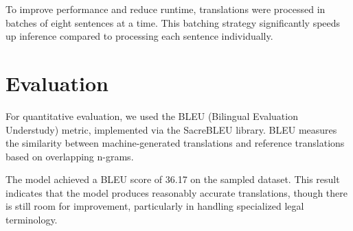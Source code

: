\documentclass[fleqn,moreauthors,10pt]{ds_report}
\begin{document}
To improve performance and reduce runtime, translations were processed in batches of eight sentences at a time. This batching strategy significantly speeds up inference compared to processing each sentence individually.

\section*{Evaluation}

For quantitative evaluation, we used the BLEU (Bilingual Evaluation Understudy) metric, implemented via the SacreBLEU library. BLEU measures the similarity between machine-generated translations and reference translations based on overlapping n-grams.

The model achieved a BLEU score of 36.17 on the sampled dataset. This result indicates that the model produces reasonably accurate translations, though there is still room for improvement, particularly in handling specialized legal terminology.


\end{document}

